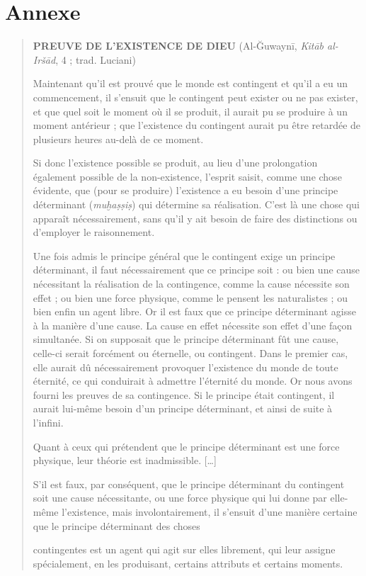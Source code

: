 \hypertarget{annexe}{%
\section{Annexe}\label{annexe}}

\begin{quote}
\textbf{PREUVE DE L'EXISTENCE DE DIEU} (Al-Ğuwaynī, \emph{Kitāb
al-Iršād}, 4 ; trad. Luciani)

Maintenant qu'il est prouvé que le monde est contingent et qu'il a eu un
commencement, il s'ensuit que le contingent peut exister ou ne pas
exister, et que quel soit le moment où il se produit, il aurait pu se
produire à un moment antérieur ; que l'existence du contingent aurait pu
être retardée de plusieurs heures au-delà de ce moment.

Si donc l'existence possible se produit, au lieu d'une prolongation
également possible de la non-existence, l'esprit saisit, comme une chose
évidente, que (pour se produire) l'existence a eu besoin d'une principe
déterminant (\emph{muḫaṣṣiṣ}) qui détermine sa réalisation. C'est là une
chose qui apparaît nécessairement, sans qu'il y ait besoin de faire des
distinctions ou d'employer le raisonnement.

Une fois admis le principe général que le contingent exige un principe
déterminant, il faut nécessairement que ce principe soit : ou bien une
cause nécessitant la réalisation de la contingence, comme la cause
nécessite son effet ; ou bien une force physique, comme le pensent les
naturalistes ; ou bien enfin un agent libre. Or il est faux que ce
principe déterminant agisse à la manière d'une cause. La cause en effet
nécessite son effet d'une façon simultanée. Si on supposait que le
principe déterminant fût une cause, celle-ci serait forcément ou
éternelle, ou contingent. Dans le premier cas, elle aurait dû
nécessairement provoquer l'existence du monde de toute éternité, ce qui
conduirait à admettre l'éternité du monde. Or nous avons fourni les
preuves de sa contingence. Si le principe était contingent, il aurait
lui-même besoin d'un principe déterminant, et ainsi de suite à l'infini.

Quant à ceux qui prétendent que le principe déterminant est une force
physique, leur théorie
est inadmissible. {[}\ldots{]}

S'il est faux, par conséquent, que le principe déterminant du contingent
soit une cause nécessitante, ou une force physique qui lui donne par
elle-même l'existence, mais involontairement, il s'ensuit d'une manière
certaine que le principe déterminant des choses

contingentes est un agent qui agit sur elles librement, qui leur assigne
spécialement, en les produisant, certains attributs et certains moments.
\end{quote}

